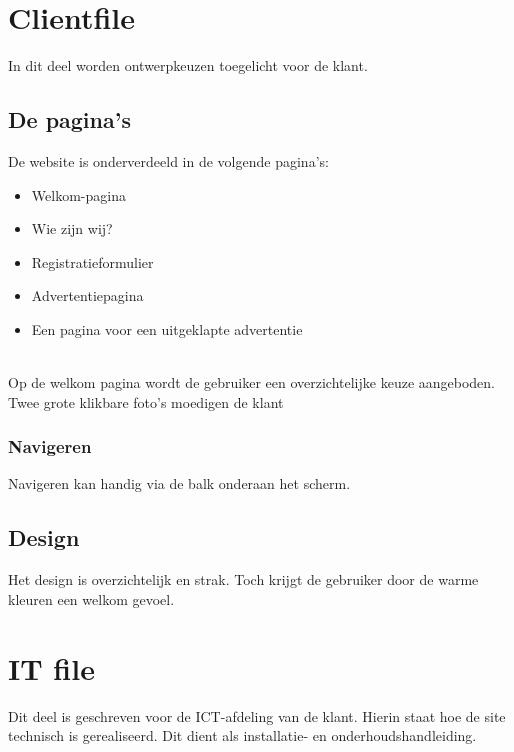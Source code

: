 \documentclass{report}
\begin{document}
\chapter{Clientfile}
    In dit deel worden ontwerpkeuzen toegelicht voor de klant.\\

    \section{De pagina's}
        De website is onderverdeeld in de volgende pagina's:
        \begin{itemize} \itemsep1pt
            \item Welkom-pagina
            \item Wie zijn wij?
            \item Registratieformulier
            \item Advertentiepagina
            \item Een pagina voor een uitgeklapte advertentie
        \end{itemize}
        \\
        Op de welkom pagina wordt de gebruiker een overzichtelijke keuze aangeboden. Twee grote klikbare foto's moedigen de klant 
    
        \subsection{Navigeren}
            Navigeren kan handig via de balk onderaan het scherm. 
    
    \section{Design}
        Het design is overzichtelijk en strak. Toch krijgt de gebruiker door de warme kleuren een welkom gevoel.

\chapter{IT file}
    Dit deel is geschreven voor de ICT-afdeling van de klant. Hierin staat hoe de site technisch is gerealiseerd. Dit dient als installatie- en onderhoudshandleiding.
\end{document}
